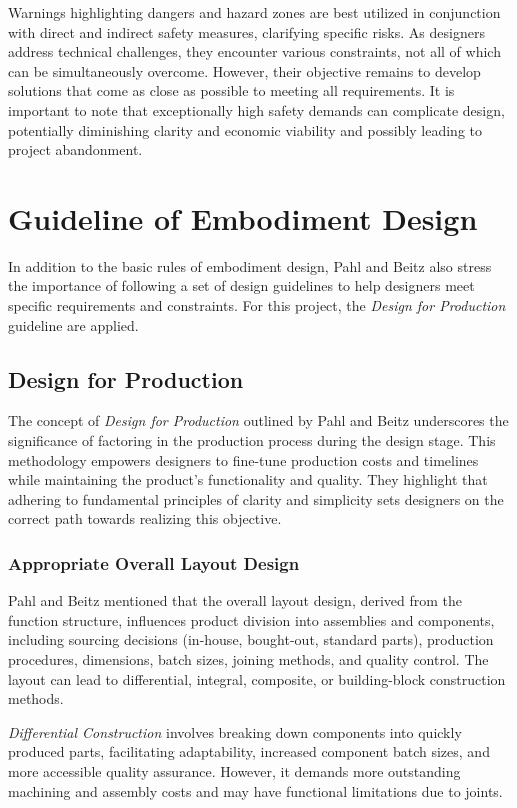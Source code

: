 Warnings highlighting dangers and hazard zones are best utilized in conjunction with direct and indirect safety measures, clarifying specific risks. As designers address technical challenges, they encounter various constraints, not all of which can be simultaneously overcome. However, their objective remains to develop solutions that come as close as possible to meeting all requirements. It is important to note that exceptionally high safety demands can complicate design, potentially diminishing clarity and economic viability and possibly leading to project abandonment.

\section{Guideline of Embodiment Design}
In addition to the basic rules of embodiment design, Pahl and Beitz \cite[308]{Pahl2007} also stress the importance of following a set of design guidelines to help designers meet specific requirements and constraints. For this project, the \textit{Design for Production} guideline are applied.

\subsection{Design for Production}
The concept of \textit{Design for Production} outlined by Pahl and Beitz \cite[355-356]{Pahl2007} underscores the significance of factoring in the production process during the design stage. This methodology empowers designers to fine-tune production costs and timelines while maintaining the product's functionality and quality. They highlight that adhering to fundamental principles of clarity and simplicity sets designers on the correct path towards realizing this objective.

\subsubsection{Appropriate Overall Layout Design}
Pahl and Beitz \cite[355-362]{Pahl2007} mentioned that the overall layout design, derived from the function structure, influences product division into assemblies and components, including sourcing decisions (in-house, bought-out, standard parts), production procedures, dimensions, batch sizes, joining methods, and quality control. The layout can lead to differential, integral, composite, or building-block construction methods.

\textit{Differential Construction} involves breaking down components into quickly produced parts, facilitating adaptability, increased component batch sizes, and more accessible quality assurance. However, it demands more outstanding machining and assembly costs and may have functional limitations due to joints.

